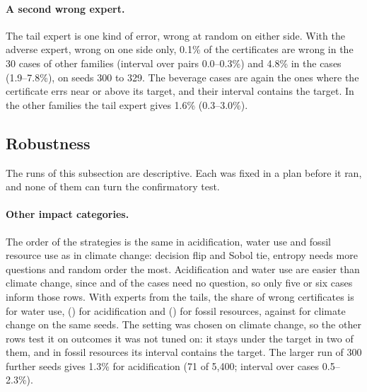 \documentclass{article}
\begin{document}
\paragraph{A second wrong expert.}
The tail expert is one kind of error, wrong at random on either side. With the adverse expert, wrong on
one side only, 0.1\% of the certificates are wrong
in the 30 cases of other families (interval over pairs 0.0--0.3\%) and 4.8\% in the \nCases{} cases
(1.9--7.8\%), on seeds 300 to 329. The beverage cases are again the ones where the certificate errs near or
above its target, and their interval contains the target. In the other families the tail expert gives 1.6\% (0.3--3.0\%).

\subsection{Robustness}\label{sec:robust}

The runs of this subsection are descriptive. Each was fixed in a plan before it ran, and none of them
can turn the confirmatory test.

\paragraph{Other impact categories.}
The order of the strategies is the same in acidification, water use and fossil resource use as in climate
change: decision flip and Sobol tie, entropy needs more questions and random order the most. Acidification
and water use are easier than climate change, since \pNoQAcid{} and \pNoQWater{} of the \nCases{} cases need no
question, so only five or six cases inform those rows. With experts from the tails, the share of wrong certificates is
\pwTailsWater{} for water use, \pwTailsAcid{} (\pwTailsCiAcid{}) for acidification and \pwTailsFossil{}
(\pwTailsCiFossil{}) for fossil resources, against \pwTailsClim{} for climate change on the same seeds. The
setting was chosen on climate change, so the other rows test it on outcomes it was not tuned on: it stays under the target in two of them, and in fossil
resources its interval contains the target. The larger run of 300 further seeds gives 1.3\% for
acidification (71 of 5,400; interval over cases 0.5--2.3\%).
\end{document}
